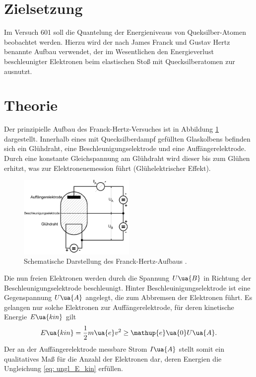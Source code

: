 \setcounter{page}{1}
\section*{Zielsetzung}
Im Versuch 601 soll die Quantelung der Energieniveaus von Queksilber-Atomen beobachtet werden.
Hierzu wird der nach James Franck und Gustav Hertz benannte Aufbau verwendet, der im Wesentlichen
den Energieverlust beschleunigter Elektronen beim elastischen Stoß mit Quecksilberatomen zur ausnutzt.

\section{Theorie}
Der prinzipielle Aufbau des Franck-Hertz-Versuches ist in Abbildung \ref{fig: schema_aufbau} dargestellt. Innerhalb
eines mit Quecksilberdampf gefüllten Glaskolbens befinden sich ein Glühdraht, eine Beschleunigungselektrode und
eine Auffängerelektrode. Durch eine konstante Gleichspannung am Glühdraht wird dieser bis zum Glühen
erhitzt, was zur Elektronenemession führt (Glühelektrischer Effekt).
\begin{figure}
  \centering
  \includegraphics[width = 0.5\textwidth]{pics/schema_aufbau.png}
  \caption{Schematische Darstellung des Franck-Hertz-Aufbaus \cite{}.}
  \label{fig: schema_aufbau}
\end{figure}
Die nun freien Elektronen werden durch die Spannung $U\ua{B}$ in Richtung der Beschleunigungselektrode
beschleunigt. Hinter Beschleuinigungselektrode ist eine Gegenspannung $U\ua{A}$ angelegt, die zum Abbremsen
der Elektronen führt. Es gelangen nur solche Elektronen zur Auffängerelektrode, für deren kinetische Energie $E\ua{kin}$
gilt
\begin{equation}
 \label{eq: ungl_E_kin}
  E\ua{kin} = \frac{1}{2}m\ua{e}v^2 \geq \mathup{e}\ua{0}U\ua{A}.
\end{equation}
Der an der Auffängerelektrode messbare Strom $I\ua{A}$ stellt somit ein qualitatives Maß für die Anzahl der
Elektronen dar, deren Energien die Ungleichung \eqref{eq: ungl_E_kin} erfüllen.\\
